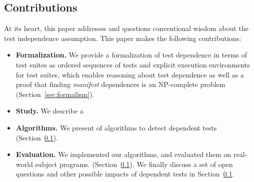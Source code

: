 \subsection{Contributions}

At its heart, this paper addresses and questions
conventional wisdom about the test independence assumption. 
This paper makes the following contributions:

\begin{itemize}
\item \textbf{Formalization.} We provide a formalization of test dependence
  in terms of test suites as ordered sequences of tests and explicit execution
  environments for test suites, which enables reasoning about test dependence
  as well as a proof that finding \emph{manifest} dependences is an NP-complete
  problem (Section~\ref{sec:formalism}).
  \item \textbf{Study.} We describe a
  \item \textbf{Algorithms.} We present  of algorithms
  to detect dependent tests (Section~\ref{}). 
  \item \textbf{Evaluation.} We implemented our algorithms, and
  evaluated them on  real-world subject programs.
   (Section~\ref{}). We finally discuss
  a set of open questions and other possible impacts of dependent
  tests in Section~\ref{}.
\end{itemize}



